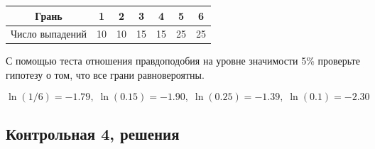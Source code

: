 \begin{enumerate}[resume]
			 \begin{center}
		\begin{tabular}{c|cccccc}
			\toprule
			Грань & 1 & 2 & 3 & 4 & 5 & 6\\
			\midrule
							Число выпадений & 10 & 10 & 15 & 15 & 25 & 25 \\
			\bottomrule
		\end{tabular}
	\end{center}

С помощью теста отношения правдоподобия на уровне значимости 5\% проверьте гипотезу о том, что все грани равновероятны.

\[
\ln(1/6)=-1.79, \; \ln(0.15)=-1.90, \; \ln(0.25)=-1.39, \; \ln(0.1)=-2.30
\]

\end{enumerate}



\subsection{Контрольная 4, решения}

